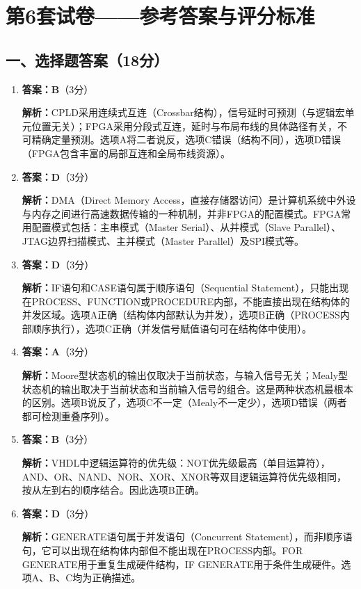 \chapter{第6套试卷——参考答案与评分标准}

\section{一、选择题答案（18分）}

\begin{enumerate}[label=\arabic*., leftmargin=*]

\item \textbf{答案：B}（3分）

\textbf{解析：}CPLD采用连续式互连（Crossbar结构），信号延时可预测（与逻辑宏单元位置无关）；FPGA采用分段式互连，延时与布局布线的具体路径有关，不可精确定量预测。选项A将二者说反，选项C错误（结构不同），选项D错误（FPGA包含丰富的局部互连和全局布线资源）。

\item \textbf{答案：D}（3分）

\textbf{解析：}DMA（Direct Memory Access，直接存储器访问）是计算机系统中外设与内存之间进行高速数据传输的一种机制，并非FPGA的配置模式。FPGA常用配置模式包括：主串模式（Master Serial）、从并模式（Slave Parallel）、JTAG边界扫描模式、主并模式（Master Parallel）及SPI模式等。

\item \textbf{答案：D}（3分）

\textbf{解析：}IF语句和CASE语句属于顺序语句（Sequential Statement），只能出现在PROCESS、FUNCTION或PROCEDURE内部，不能直接出现在结构体的并发区域。选项A正确（结构体内部默认为并发），选项B正确（PROCESS内部顺序执行），选项C正确（并发信号赋值语句可在结构体中使用）。

\item \textbf{答案：A}（3分）

\textbf{解析：}Moore型状态机的输出仅取决于当前状态，与输入信号无关；Mealy型状态机的输出取决于当前状态和当前输入信号的组合。这是两种状态机最根本的区别。选项B说反了，选项C不一定（Mealy不一定少），选项D错误（两者都可检测重叠序列）。

\item \textbf{答案：B}（3分）

\textbf{解析：}VHDL中逻辑运算符的优先级：NOT优先级最高（单目运算符），AND、OR、NAND、NOR、XOR、XNOR等双目逻辑运算符优先级相同，按从左到右的顺序结合。因此选项B正确。

\item \textbf{答案：D}（3分）

\textbf{解析：}GENERATE语句属于并发语句（Concurrent Statement），而非顺序语句，它可以出现在结构体内部但不能出现在PROCESS内部。FOR GENERATE用于重复生成硬件结构，IF GENERATE用于条件生成硬件。选项A、B、C均为正确描述。

\end{enumerate}

